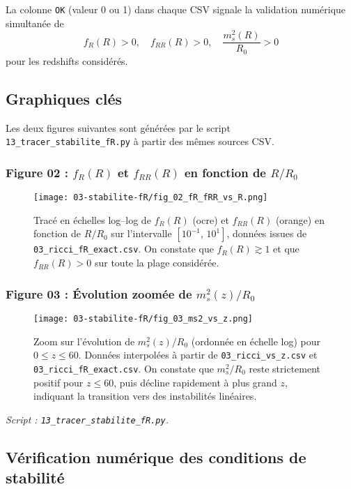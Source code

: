 La colonne \texttt{OK} (valeur 0 ou 1) dans chaque CSV signale la validation numérique simultanée de
\[
  f_{R}(R)>0,\quad f_{RR}(R)>0,\quad \frac{m_{s}^{2}(R)}{R_{0}}>0
\]
pour les redshifts considérés.  

\subsection{Graphiques clés}

Les deux figures suivantes sont générées par le script \texttt{13\_tracer\_stabilite\_fR.py} 
à partir des mêmes sources CSV.

\subsubsection*{Figure 02 : $f_{R}(R)$ et $f_{RR}(R)$ en fonction de $R/R_{0}$}

\begin{figure}[htbp]
  \centering
  \texttt{[image: 03-stabilite-fR/fig\_02\_fR\_fRR\_vs\_R.png]}
  \caption{Tracé en échelles log–log de $f_{R}(R)$ (ocre) et $f_{RR}(R)$ (orange)  
    en fonction de $R/R_{0}$ sur l’intervalle $[10^{-1},\,10^{1}]$, données issues de \texttt{03\_ricci\_fR\_exact.csv}.  
    On constate que $f_{R}(R)\gtrsim1$ et que $f_{RR}(R)>0$ sur toute la plage considérée.}
  \label{fig:fR_fRR_vs_R}
\end{figure}

\subsubsection*{Figure 03 : Évolution zoomée de $m_{s}^{2}(z)/R_{0}$}

\begin{figure}[htbp]
  \centering
  \texttt{[image: 03-stabilite-fR/fig\_03\_ms2\_vs\_z.png]}
  \caption{Zoom sur l’évolution de $m_{s}^{2}(z)/R_{0}$ (ordonnée en échelle log)  
    pour $0\le z\le60$. Données interpolées à partir de \texttt{03\_ricci\_vs\_z.csv}  
    et \texttt{03\_ricci\_fR\_exact.csv}. On constate que $m_{s}^{2}/R_{0}$  
    reste strictement positif pour $z\le60$, puis décline rapidement à plus grand $z$,  
    indiquant la transition vers des instabilités linéaires.}
  \label{fig:ms2_vs_z}
\end{figure}

\noindent\emph{Script : \texttt{13\_tracer\_stabilite\_fR.py}.}

\subsection{Vérification numérique des conditions de stabilité}

